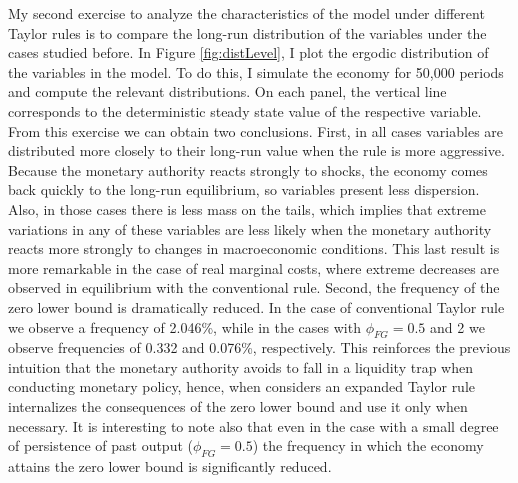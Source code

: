 \documentclass[12pt]{article}
\numberwithin{equation}{section}
\begin{document}
My second exercise to analyze the characteristics of the model under different Taylor rules is to compare the long-run distribution of the variables under the cases studied before. In Figure \ref{fig:distLevel}, I plot the ergodic distribution of the variables in the model. To do this, I simulate the economy for 50,000 periods and compute the relevant distributions. On each panel, the vertical line corresponds to the deterministic steady state value of the respective variable. From this exercise we can obtain two conclusions. First, in all cases variables are distributed more closely to their long-run value when the rule is more aggressive. Because the monetary authority reacts strongly to shocks, the economy comes back quickly to the long-run equilibrium, so variables present less dispersion. Also, in those cases there is less mass on the tails, which implies that extreme variations in any of these variables are less likely when the monetary authority reacts more strongly to changes in macroeconomic conditions. This last result is more remarkable in the case of real marginal costs, where extreme decreases are observed in equilibrium with the conventional rule. Second, the frequency of the zero lower bound is dramatically reduced. In the case of conventional Taylor rule we observe a frequency of 2.046\%, while in the cases with $\phi_{FG}=0.5$ and 2 we observe frequencies of 0.332 and 0.076\%, respectively. This reinforces the previous intuition that the monetary authority avoids to fall in a liquidity trap when conducting monetary policy, hence, when considers an expanded Taylor rule internalizes the consequences of the zero lower bound and use it only when necessary. It is interesting to note also that even in the case with a small degree of persistence of past output ($\phi_{FG}=0.5$) the frequency in which the economy attains the zero lower bound is significantly reduced.

\end{document}
